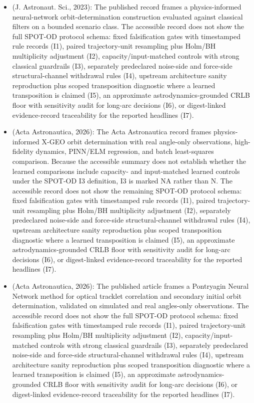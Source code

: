 \begin{itemize}[leftmargin=*]
  \item \cite{scorsoglio2023pinn} (J. Astronaut. Sci., 2023): The published record frames a physics-informed neural-network orbit-determination construction evaluated against classical filters on a bounded scenario class. The accessible record does not show the full SPOT-OD protocol schema: fixed falsification gates with timestamped rule records (I1), paired trajectory-unit resampling plus Holm/BH multiplicity adjustment (I2), capacity/input-matched controls with strong classical guardrails (I3), separately predeclared noise-side and force-side structural-channel withdrawal rules (I4), upstream architecture sanity reproduction plus scoped transposition diagnostic where a learned transposition is claimed (I5), an approximate astrodynamics-grounded CRLB floor with sensitivity audit for long-arc decisions (I6), or digest-linked evidence-record traceability for the reported headlines (I7).
  \item \cite{scorsoglio2026xgeo} (Acta Astronautica, 2026): The Acta Astronautica record frames physics-informed X-GEO orbit determination with real angle-only observations, high-fidelity dynamics, PINN/ELM regression, and batch least-squares comparison. Because the accessible summary does not establish whether the learned comparisons include capacity- and input-matched learned controls under the SPOT-OD I3 definition, I3 is marked NA rather than N. The accessible record does not show the remaining SPOT-OD protocol schema: fixed falsification gates with timestamped rule records (I1), paired trajectory-unit resampling plus Holm/BH multiplicity adjustment (I2), separately predeclared noise-side and force-side structural-channel withdrawal rules (I4), upstream architecture sanity reproduction plus scoped transposition diagnostic where a learned transposition is claimed (I5), an approximate astrodynamics-grounded CRLB floor with sensitivity audit for long-arc decisions (I6), or digest-linked evidence-record traceability for the reported headlines (I7).
  \item \cite{ramponi2026pontryagin} (Acta Astronautica, 2026): The published article frames a Pontryagin Neural Network method for optical tracklet correlation and secondary initial orbit determination, validated on simulated and real angles-only observations. The accessible record does not show the full SPOT-OD protocol schema: fixed falsification gates with timestamped rule records (I1), paired trajectory-unit resampling plus Holm/BH multiplicity adjustment (I2), capacity/input-matched controls with strong classical guardrails (I3), separately predeclared noise-side and force-side structural-channel withdrawal rules (I4), upstream architecture sanity reproduction plus scoped transposition diagnostic where a learned transposition is claimed (I5), an approximate astrodynamics-grounded CRLB floor with sensitivity audit for long-arc decisions (I6), or digest-linked evidence-record traceability for the reported headlines (I7).

\end{itemize}
